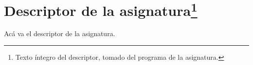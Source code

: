 \section[Descriptor de la asignatura]{Descriptor de la asignatura\footnote{Texto íntegro del descriptor, tomado del programa de la asignatura.}}

Acá va el descriptor de la asignatura.
\pagebreak